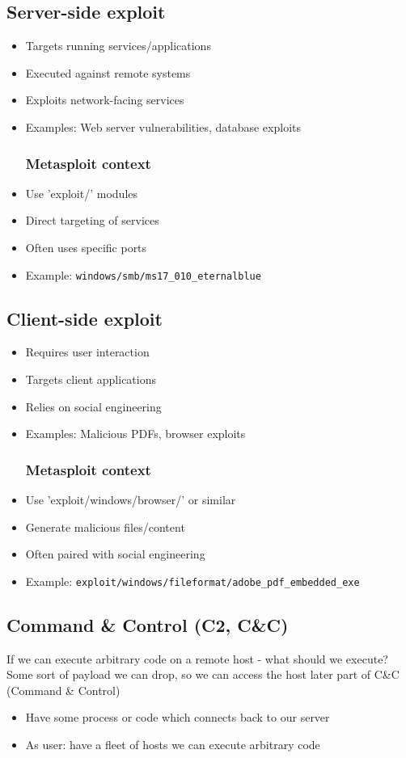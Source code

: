\subsection{Server-side exploit}
\begin{itemize}
	\item Targets running services/applications
	\item Executed against remote systems
	\item Exploits network-facing services
	\item Examples: Web server vulnerabilities, database exploits
  \subsubsection*{Metasploit context}
	\item Use 'exploit/' modules
	\item Direct targeting of services
	\item Often uses specific ports
	\item Example: \lstinline|windows/smb/ms17_010_eternalblue|
\end{itemize}

\subsection{Client-side exploit}
\begin{itemize}
	\item Requires user interaction
	\item Targets client applications
	\item Relies on social engineering
	\item Examples: Malicious PDFs, browser exploits
  \subsubsection*{Metasploit context}
	\item Use 'exploit/windows/browser/' or similar
	\item Generate malicious files/content
	\item Often paired with social engineering
	\item Example: \lstinline|exploit/windows/fileformat/adobe_pdf_embedded_exe|
\end{itemize}


\subsection{Command \& Control (C2, C\&C)}
If we can execute arbitrary code on a remote host - what should we execute? Some sort of payload we can drop, so we can access the host later part of C\&C (Command \& Control)
\begin{itemize}
  \item Have some process or code which connects back to our server
  \item As user: have a fleet of hosts we can execute arbitrary code
\end{itemize}

